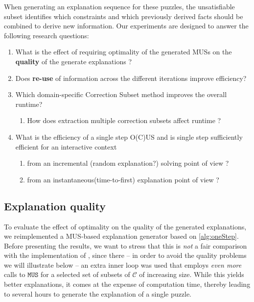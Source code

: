 \documentclass[a4paper,UKenglish,cleveref, autoref, thm-restate, pdfa]{lipics-v2021}
\newcommand\m[1]{\mathcal{#1}}
\newcommand\formulac{\ensuremath{\m{C} }\xspace}
\newcommand\mm[1]{\ensuremath{#1}\xspace}
\newcommand\call[1]{\mm{\texttt{#1}}}
\begin{document}
	When generating an explanation sequence for these puzzles, the unsatisfiable subset identifies which constraints and which previously derived facts should be combined to derive new information. Our experiments are designed to answer the following research questions:  
	
	\begin{enumerate}%
		\item  What is the effect of requiring optimality of the generated MUSs on the \textbf{quality} of the generate explanations ? \label{rq:q1}
		\item   Does \textbf{re-use} of information across the different iterations improve efficiency? \label{rq:q2}
		\item  Which domain-specific Correction Subset method improves the overall runtime? \label{rq:q3}
		\begin{enumerate}
			\item How does extraction multiple correction subsets affect runtime ? 
		\end{enumerate}
		\item   What is the efficiency of a single step O(C)US and is single step sufficiently efficient for an interactive context 
		\begin{enumerate}
			\item from an incremental (random explanation?) solving point of view ?
			\item from an instantaneous(time-to-first) explanation  point of view ?
		\end{enumerate} \label{rq:q4}
	\end{enumerate}
	
	\subsection{Explanation quality}
	To evaluate the effect of optimality on the quality of the generated explanations, we reimplemented a MUS-based explanation generator based on \cref{alg:oneStep}. 
	Before presenting the results, we want to stress that this is \emph{not} a fair comparison with the implementation of \cite{ecai/BogaertsGCG20}, since there -- in order to avoid the quality problems we will illustrate below --  an extra inner loop was used that employs \emph{even more} calls to \call{MUS} for a selected set of subsets of \formulac of increasing size. %
	While this yields better explanations, it comes at the expense of computation time, thereby leading to several hours to generate the explanation of a single puzzle. 
	
\end{document}
